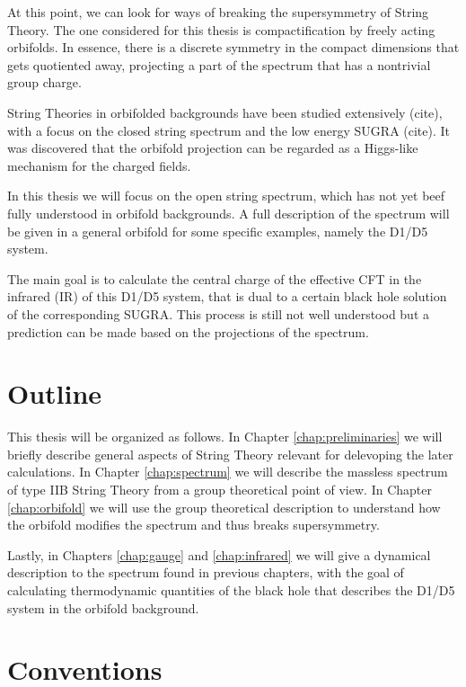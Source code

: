 At this point, we can look for ways of breaking the supersymmetry of String Theory. The one considered for this thesis is compactification by freely acting orbifolds. In essence, there is a discrete symmetry in the compact dimensions that gets quotiented away, projecting a part of the spectrum that has a nontrivial group charge.

String Theories in orbifolded backgrounds have been studied extensively (cite), with a focus on the closed string spectrum and the low energy SUGRA (cite). It was discovered that the orbifold projection can be regarded as a Higgs-like mechanism for the charged fields.

In this thesis we will focus on the open string spectrum, which has not yet beef fully understood in orbifold backgrounds. A full description of the spectrum will be given in a general orbifold for some specific examples, namely the D1/D5 system.

The main goal is to calculate the central charge of the effective CFT in the infrared (IR) of this D1/D5 system, that is dual to a certain black hole solution of the corresponding SUGRA. This process is still not well understood but a prediction can be made based on the projections of the spectrum.

\section{Outline}

This thesis will be organized as follows. In Chapter \ref{chap:preliminaries} we will briefly describe general aspects of String Theory relevant for delevoping the later calculations. In Chapter \ref{chap:spectrum} we will describe the massless spectrum of type IIB String Theory from a group theoretical point of view. In Chapter \ref{chap:orbifold} we will use the group theoretical description to understand how the orbifold modifies the spectrum and thus breaks supersymmetry.

Lastly, in Chapters \ref{chap:gauge} and \ref{chap:infrared} we will give a dynamical description to the spectrum found in previous chapters, with the goal of calculating thermodynamic quantities of the black hole that describes the D1/D5 system in the orbifold background.

\section{Conventions}